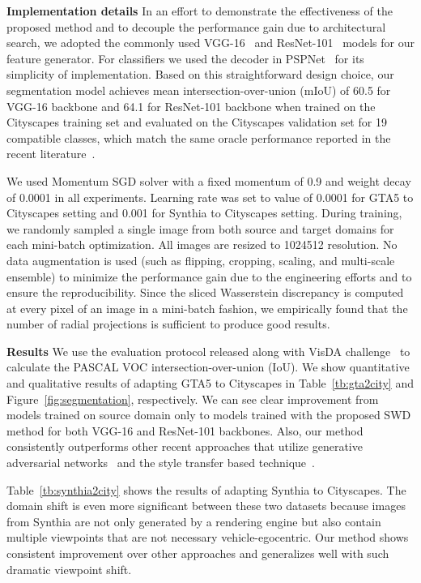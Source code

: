 \documentclass[10pt,twocolumn,letterpaper]{article}
\begin{document}
 

\vspace{2mm}
\noindent \textbf{Implementation details}
In an effort to demonstrate the effectiveness of the proposed method and to decouple the performance gain due to architectural search, we adopted the commonly used VGG-16~\cite{simonyan2014very} and ResNet-101~\cite{he2016deep} models for our feature generator. For classifiers we used the decoder in PSPNet~\cite{zhao2017pyramid} for its simplicity of implementation. Based on this straightforward design choice, our segmentation model achieves mean intersection-over-union (mIoU) of 60.5 for VGG-16 backbone and 64.1 for ResNet-101 backbone when trained on the Cityscapes training set and evaluated on the Cityscapes validation set for 19 compatible classes, which match the same oracle performance reported in the recent literature~\cite{tsai2018learning, wu2018dcan}.

We used Momentum SGD solver with a fixed momentum of 0.9 and weight decay of 0.0001 in all experiments. Learning rate was set to value of 0.0001 for GTA5 to Cityscapes setting and 0.001 for Synthia to Cityscapes setting. During training, we randomly sampled a single image from both source and target domains for each mini-batch optimization. All images are resized to 1024512 resolution. No data augmentation is used (such as flipping, cropping, scaling, and multi-scale ensemble) to minimize the performance gain due to the engineering efforts and to ensure the reproducibility.
Since the sliced Wasserstein discrepancy is computed at every pixel of an image in a mini-batch fashion, we empirically found that the number of radial projections  is sufficient to produce good results.

\vspace{2mm}
\noindent \textbf{Results}
We use the evaluation protocol released along with VisDA challenge~\cite{visda2017} to calculate the PASCAL VOC intersection-over-union (IoU). We show quantitative and qualitative results of adapting GTA5 to Cityscapes in Table~\ref{tb:gta2city} and Figure~\ref{fig:segmentation}, respectively. We can see clear improvement from models trained on source domain only to models trained with the proposed SWD method for both VGG-16 and ResNet-101 backbones. Also, our method consistently outperforms other recent approaches that utilize generative adversarial networks~\cite{tsai2018learning, hoffman2017cycada} and the style transfer based technique~\cite{wu2018dcan}.

Table~\ref{tb:synthia2city} shows the results of adapting Synthia to Cityscapes. 
The domain shift is even more significant between these two datasets because images from Synthia are not only generated by a rendering engine but also contain multiple viewpoints that are not necessary vehicle-egocentric. Our method shows consistent improvement over other approaches and generalizes well with such dramatic viewpoint shift.
\end{document}
